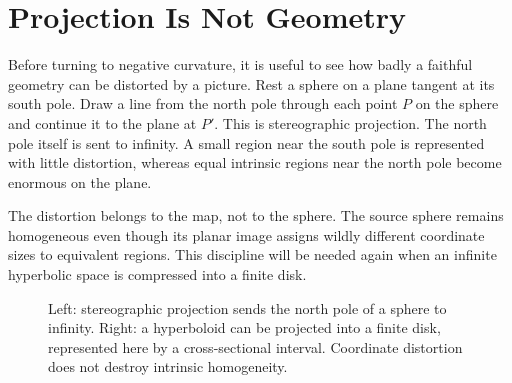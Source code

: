 \section{Projection Is Not Geometry}

Before turning to negative curvature, it is useful to see how badly a faithful geometry can be distorted by a picture. Rest a sphere on a plane tangent at its south pole. Draw a line from the north pole through each point \(P\) on the sphere and continue it to the plane at \(P'\). This is stereographic projection. The north pole itself is sent to infinity. A small region near the south pole is represented with little distortion, whereas equal intrinsic regions near the north pole become enormous on the plane.

The distortion belongs to the map, not to the sphere. The source sphere remains homogeneous even though its planar image assigns wildly different coordinate sizes to equivalent regions. This discipline will be needed again when an infinite hyperbolic space is compressed into a finite disk.

\begin{figure}[htbp]
\centering
{}%
\caption{Left: stereographic projection sends the north pole of a sphere to infinity. Right: a hyperboloid can be projected into a finite disk, represented here by a cross-sectional interval. Coordinate distortion does not destroy intrinsic homogeneity.}
\label{fig:c03-projections}
\end{figure}

